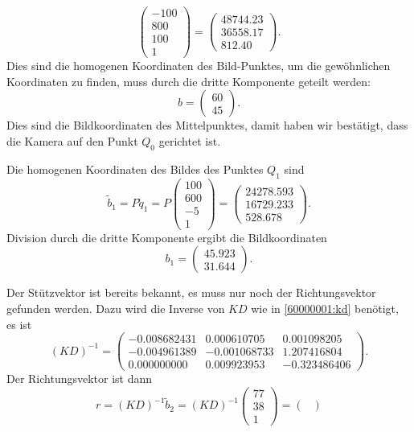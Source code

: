 \begin{loesung}
\begin{teilaufgaben}
\[\begin{pmatrix}
-100\\800\\100\\1
\end{pmatrix}
=
\begin{pmatrix}
   48744.23\\
   36558.17\\
     812.40
\end{pmatrix}.
\]
Dies sind die homogenen Koordinaten des Bild-Punktes, um die gewöhnlichen
Koordinaten zu finden, muss durch die dritte Komponente geteilt werden:
\[
b
=
\begin{pmatrix}
60\\45
\end{pmatrix}.
\]
Dies sind die Bildkoordinaten des Mittelpunktes, damit haben
wir bestätigt, dass die Kamera auf den Punkt $Q_0$ gerichtet ist.
\item
Die homogenen Koordinaten des Bildes des Punktes $Q_1$ sind
\[
\tilde b_1
=
P\tilde q_1
=
P\begin{pmatrix}100\\600\\-5\\1\end{pmatrix}
=
\begin{pmatrix}
   24278.593\\
   16729.233\\
     528.678
\end{pmatrix}.
\]
Division durch die dritte Komponente ergibt die Bildkoordinaten
\[
b_1 = \begin{pmatrix}
   45.923\\
   31.644
\end{pmatrix}.
\]
\item
Der Stützvektor ist bereits bekannt, es muss nur noch der Richtungsvektor
gefunden werden.
Dazu wird die Inverse von $KD$ wie in \eqref{60000001:kd} benötigt,
es ist
\[
(KD)^{-1}
=
\begin{pmatrix}
  -0.008682431&  0.000610705&  0.001098205\\
  -0.004961389& -0.001068733&  1.207416804\\
   0.000000000&  0.009923953& -0.323486406
\end{pmatrix}.
\]
Der Richtungsvektor ist dann
\[
r = (KD)^{-1}\tilde b_2 = (KD)^{-1} \begin{pmatrix} 77\\ 38\\ 1\end{pmatrix}
=
\begin{pmatrix}

\end{pmatrix}\]
\end{teilaufgaben}
\end{loesung}
